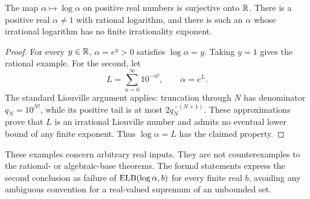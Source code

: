 \begin{proposition}\label{prop:counterexamples}
The map \(\alpha\mapsto\log\alpha\) on positive real numbers is
surjective onto \(\mathbb R\). There is a positive real \(\alpha\ne1\)
with rational logarithm, and there is such an \(\alpha\) whose
irrational logarithm has no finite irrationality exponent.
\end{proposition}
\begin{proof}
For every \(y\in\mathbb R\), \(\alpha=e^y>0\) satisfies
\(\log\alpha=y\). Taking \(y=1\) gives the rational example.
For the second, let
\[
 L=\sum_{n=0}^\infty10^{-n!},\qquad \alpha=e^L.
\]
The standard Liouville argument applies: truncation through \(N\)
has denominator \(q_N=10^{N!}\), while its positive tail is at most
\(2q_N^{-(N+1)}\). These approximations prove that \(L\) is an
irrational Liouville number and admits no eventual lower bound of
any finite exponent. Thus \(\log\alpha=L\) has the claimed property.
\end{proof}

These examples concern arbitrary real inputs. They are not
counterexamples to the rational- or algebraic-base theorems.
The formal statements express the second conclusion as failure of
\(\operatorname{ELB}(\log\alpha,b)\) for every finite real \(b\), avoiding any
ambiguous convention for a real-valued supremum of an unbounded set.
